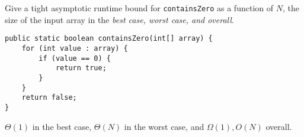 \begin{blocksection}
\question Give a tight asymptotic runtime bound for \lstinline$containsZero$ as
a function of $N$, the size of the input array in the \emph{best case, worst
case, and overall}.

\begin{lstlisting}
public static boolean containsZero(int[] array) {
    for (int value : array) {
        if (value == 0) {
            return true;
        }
    }
    return false;
}
\end{lstlisting}

\begin{solution}
$\Theta(1)$ in the best case, $\Theta(N)$ in the worst case, and $\Omega(1),
O(N)$ overall.
\end{solution}
\end{blocksection}
